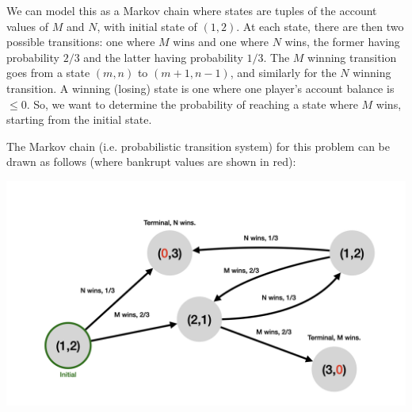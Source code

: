 \documentclass[10pt,a4paper]{article}
\begin{document}
We can model this as a Markov chain where states are tuples of the account values of $M$ and $N$, with initial state of $(1,2)$. At each state, there are then two possible transitions: one where $M$ wins and one where $N$ wins, the former having probability $2/3$ and the latter having probability $1/3$. The $M$ winning transition goes from a state $(m,n)$ to $(m+1,n-1)$, and similarly for the $N$ winning transition. A winning (losing) state is one where one player's account balance is $\leq 0$. So, we want to determine the probability of reaching a state where $M$ wins, starting from the initial state.

The Markov chain (i.e. probabilistic transition system) for this problem can be drawn as follows (where bankrupt values are shown in red):
\begin{center}
    \includegraphics[scale=0.1]{diagrams/prob_diagrams/prob_diagrams.002.png}
\end{center}

% 
% 
\end{document}
